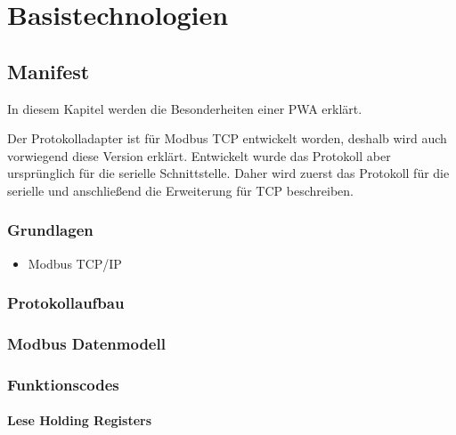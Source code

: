 \chapter{Basistechnologien}
\thispagestyle{standard}
\pagestyle{standard}
\renewcommand{\footrulewidth}{0.4pt}

\section{Manifest}

In diesem Kapitel werden die Besonderheiten einer PWA erklärt.

Der Protokolladapter ist für Modbus TCP entwickelt worden, deshalb wird auch vorwiegend diese Version erklärt. Entwickelt wurde das Protokoll aber ursprünglich für die serielle Schnittstelle. Daher wird zuerst das Protokoll für die serielle und anschließend die Erweiterung für TCP beschreiben.

\subsection{}



\subsection{Grundlagen}


\begin{itemize}
    \item Modbus TCP/IP
\end{itemize}


\subsection{Protokollaufbau}
\label{sec:Protokollaufbau}


\subsection{Modbus Datenmodell}

\label{tab:modbusDataModel}

\subsection{Funktionscodes} 
\label{sec:Funktionscodes}

\subsubsection{Lese Holding Registers}
\label{sec:LeseHoldingRegisters}

